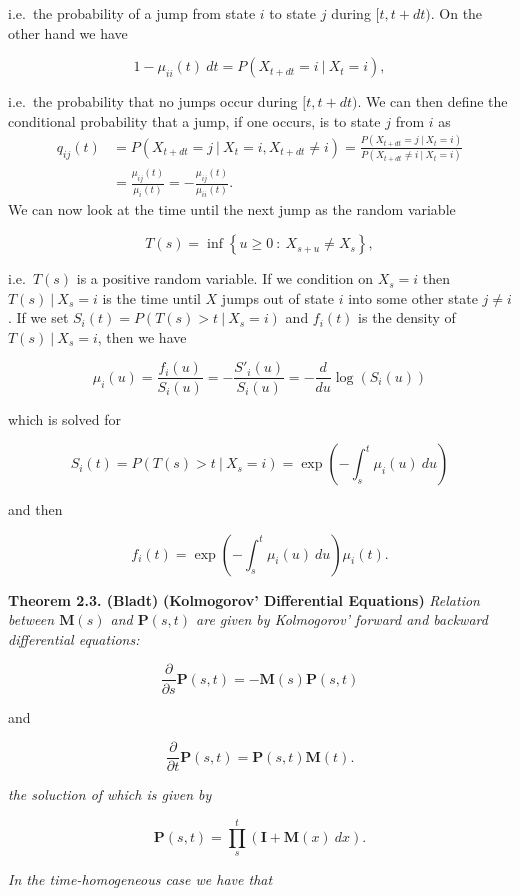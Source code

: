 \documentclass[
]{book}
\begin{document}
i.e.~the probability of a jump from state \(i\) to state \(j\) during \([t,t+dt)\). On the other hand we have

\[
1-\mu_{ii}(t)\ dt=P(X_{t+dt}=i\ \vert\ X_t=i),
\]

i.e.~the probability that no jumps occur during \([t,t+dt)\). We can then define the conditional probability that a jump, if one occurs, is to state \(j\) from \(i\) as
\begin{align*}
q_{ij}(t)&=P(X_{t+dt}=j\ \vert\  X_t=i,X_{t+dt}\ne i)=\frac{P(X_{t+dt}=j\ \vert\  X_t=i)}{P(X_{t+dt}\ne i\ \vert\  X_t=i)}\\
&=\frac{\mu_{ij}(t)}{\mu_i(t)}=-\frac{\mu_{ij}(t)}{\mu_{ii}(t)}.
\end{align*}
We can now look at the time until the next jump as the random variable

\[
T(s)=\inf\left\{u\ge 0\ :\ X_{s+u}\ne X_s\right\},
\]

i.e.~\(T(s)\) is a positive random variable. If we condition on \(X_s=i\) then \(T(s)\ \vert\ X_s=i\) is the time until \(X\) jumps out of state \(i\) into some other state \(j\ne i\). If we set \(S_i(t)=P(T(s)>t\ \vert\ X_s=i)\) and \(f_i(t)\) is the density of \(T(s)\ \vert\ X_s=i\), then we have

\[
\mu_i(u)=\frac{f_i(u)}{S_i(u)}=-\frac{S'_i(u)}{S_i(u)}=-\frac{d}{du}\log(S_i(u))
\]

which is solved for

\[
S_i(t)=P(T(s)>t\ \vert\ X_s=i)=\exp\left(-\int_s^t \mu_i(u)\ du\right)
\]

and then

\[
f_i(t)=\exp\left(-\int_s^t \mu_i(u)\ du\right)\mu_i(t).
\]

\textbf{Theorem 2.3. (Bladt)} \textbf{(Kolmogorov' Differential Equations)} \emph{Relation between \(\mathbf{M}(s)\) and \(\mathbf{P}(s,t)\) are given by Kolmogorov' forward and backward differential equations:}

\[
\frac{\partial}{\partial s}\mathbf{P}(s,t)=-\mathbf{M}(s)\mathbf{P}(s,t)
\]

and

\[
\frac{\partial}{\partial t}\mathbf{P}(s,t)=\mathbf{P}(s,t)\mathbf{M}(t).
\]

\emph{the soluction of which is given by}

\[
\mathbf{P}(s,t)=\prod_s^t(\mathbf{I}+\mathbf{M}(x)\ dx).
\]

\emph{In the time-homogeneous case we have that}
\end{document}

